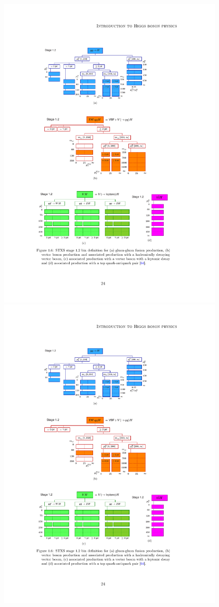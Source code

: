 \documentclass[11pt,twoside]{book}
\begin{document}
\begin{figure}[htbp]
    \centering
    \includegraphics[width=0.7\linewidth]{images/STXSbins_ggF}\\
    \includegraphics[width=0.7\linewidth]{images/STXSbins_VBF_VqqH}\\

\end{figure}
\end{document}
